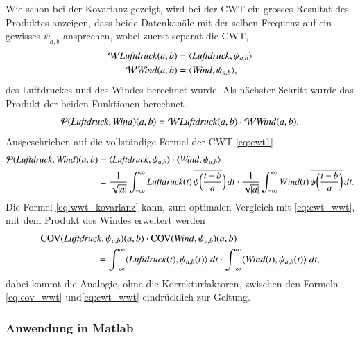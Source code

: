 \begin{refsection}
Wie schon bei der Kovarianz gezeigt, wird bei der CWT ein grosses Resultat des Produktes anzeigen, dass beide Datenkanäle mit der selben Frequenz auf ein gewisses $\psi_{a,b}$ ansprechen,  wobei zuerst separat die CWT, 
\begin{align}
\mathcal{W}\text{\textit{Luftdruck}}(a,b) &= \langle \text{\textit{Luftdruck}},\psi_{a,b}\rangle
\\
\mathcal{W}\text{\textit{Wind}}(a,b) &= \langle \text{\textit{Wind}},\psi_{a,b}\rangle,
\end{align}
des Luftdruckes und des Windes berechnet wurde.
Als nächster Schritt wurde das Produkt der beiden Funktionen berechnet.
\begin{equation}
\mathcal{P}(\text{\textit{Luftdruck}},\text{\textit{Wind}})(a,b) = \mathcal{W}\text{\textit{Luftdruck}}(a,b) \cdot \mathcal{W}\text{\textit{Wind}}(a,b).
\label{eq:produkt-wwt}
\end{equation}
Ausgeschrieben auf die vollständige Formel der CWT \eqref{eq:cwt1}
\begin{align}
\mathcal{P}(\text{\textit{Luftdruck}},\text{\textit{Wind}})(a,b)
&=
\langle \text{\textit{Luftdruck}},\psi_{a,b}\rangle \cdot \langle \text{\textit{Wind}},\psi_{a,b} \rangle
\notag
\\
&=
\frac{1}{\sqrt{|a|}}\int_{-\infty}^\infty \text{\textit{Luftdruck}}(t)\,\overline{
	\psi\biggl(\frac{t-b}{a}}\biggr)\,dt
\cdot
\frac{1}{\sqrt{|a|}}\int_{-\infty}^\infty Wind(t)\,\overline{
	\psi\biggl(\frac{t-b}{a}\biggr)}\,dt .
\label{eq:cwt_wwt}
\end{align}
Die Formel \eqref{eq:wwt_kovarianz} kann, zum optimalen Vergleich mit \eqref{eq:cwt_wwt}, mit dem Produkt des Windes erweitert werden
\begin{equation}
\begin{split}
\operatorname{COV}(\text{\textit{Luftdruck}}, \psi_{a,b})(a,b)\cdot \operatorname{COV}(\text{\textit{Wind}}, \psi_{a,b})(a,b) \hspace{3cm} \\
=  \int _{-\infty}^\infty \langle \text{\textit{Luftdruck}}(t),\psi_{a,b}(t)\rangle \text{\space}dt \cdot \int _{-\infty}^\infty \langle \text{\textit{Wind}}(t),\psi_{a,b}(t)\rangle \text{\space}dt,
\label{eq:cov_wwt}
\end{split}
\end{equation}
dabei kommt die Analogie, ohne die Korrekturfaktoren, zwischen den Formeln \eqref{eq:cov_wwt} und\eqref{eq:cwt_wwt} eindrücklich zur Geltung.

\subsubsection{Anwendung in Matlab}


\end{refsection}
